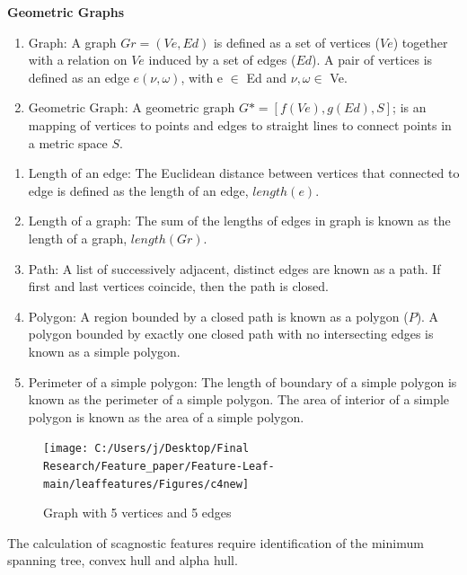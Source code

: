 \documentclass{article}
\begin{document}
\textbf{Geometric Graphs}

\begin{enumerate}
\def\labelenumi{\roman{enumi})}
\item
  Graph: A graph \(Gr = (Ve, Ed)\) is defined as a set of vertices
  (\(Ve\)) together with a relation on \(Ve\) induced by a set of edges
  (\(Ed\)). A pair of vertices is defined as an edge \(e(\nu,\omega)\),
  with e \(\in\) Ed and \(\nu,\omega \in\) Ve.
\item
  Geometric Graph: A geometric graph \(G* = [f(Ve), g(Ed), S]\); is an
  mapping of vertices to points and edges to straight lines to connect
  points in a metric space \(S\).
\end{enumerate}

\begin{enumerate}
\def\labelenumi{\roman{enumi})}
\setcounter{enumi}{2}
\item
  Length of an edge: The Euclidean distance between vertices that
  connected to edge is defined as the length of an edge, \(length(e)\).
\item
  Length of a graph: The sum of the lengths of edges in graph is known
  as the length of a graph, \(length(Gr)\).
\item
  Path: A list of successively adjacent, distinct edges are known as a
  path. If first and last vertices coincide, then the path is closed.
\item
  Polygon: A region bounded by a closed path is known as a polygon
  (\(P\)). A polygon bounded by exactly one closed path with no
  intersecting edges is known as a simple polygon.
\item
  Perimeter of a simple polygon: The length of boundary of a simple
  polygon is known as the perimeter of a simple polygon. The area of
  interior of a simple polygon is known as the area of a simple polygon.
\end{enumerate}

\begin{figure}[!ht]

{\centering \texttt{[image: C:/Users/j/Desktop/Final Research/Feature\_paper/Feature-Leaf-main/leaffeatures/Figures/c4new]} 

}

\caption{\label{scagimg5}Graph with 5 vertices and 5 edges}\label{fig:unnamed-chunk-31}
\end{figure}

The calculation of scagnostic features require identification of the
minimum spanning tree, convex hull and alpha hull.
\end{document}
